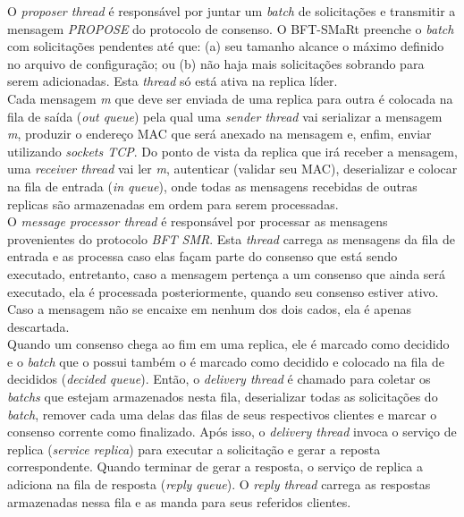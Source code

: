 	O \textit{proposer thread} é responsável por juntar um \textit{batch} de solicitações e transmitir a mensagem \textit{PROPOSE} do protocolo de consenso. O BFT-SMaRt preenche o \textit{batch} com solicitações pendentes até que: (a) seu tamanho alcance o máximo definido no arquivo de configuração; ou (b) não haja mais solicitações sobrando para serem adicionadas. Esta \textit{thread} só está ativa na replica líder. \\
	
	Cada mensagem \textit{m} que deve ser enviada de uma replica para outra é colocada na fila de saída (\textit{out queue}) pela qual uma \textit{sender thread} vai serializar a mensagem \textit{m}, produzir o endereço MAC que será anexado na mensagem e, enfim, enviar utilizando \textit{sockets TCP}. Do ponto de vista da replica que irá receber a mensagem, uma \textit{receiver thread} vai ler \textit{m}, autenticar (validar seu MAC), deserializar e colocar na fila de entrada (\textit{in queue}), onde todas as mensagens recebidas de outras replicas são armazenadas em ordem para serem processadas.  \\
	
	O \textit{message processor thread} é responsável por processar as mensagens provenientes do protocolo \textit{BFT SMR}. Esta \textit{thread} carrega as mensagens da fila de entrada e as processa caso elas façam parte do consenso que está sendo executado, entretanto, caso a mensagem pertença a um consenso que ainda será executado, ela é processada posteriormente, quando seu consenso estiver ativo. Caso a mensagem não se encaixe em nenhum dos dois cados, ela é apenas descartada. \\
	
	 Quando um consenso chega ao fim em uma replica, ele é marcado como decidido e o \textit{batch} que o possui também o é marcado como decidido e colocado na fila de decididos (\textit{decided queue}). Então, o \textit{delivery thread} é chamado para coletar os \textit{batchs} que estejam armazenados nesta fila, deserializar todas as solicitações do \textit{batch}, remover cada uma delas das filas de seus respectivos clientes e marcar o  consenso corrente como finalizado. Após isso, o \textit{delivery thread} invoca o serviço de replica (\textit{service replica}) para executar a solicitação e gerar a reposta correspondente. Quando terminar de gerar a resposta, o serviço de replica a adiciona na fila de resposta (\textit{reply queue}). O \textit{reply thread} carrega as respostas armazenadas nessa fila e as manda para seus referidos clientes. \\
	 
